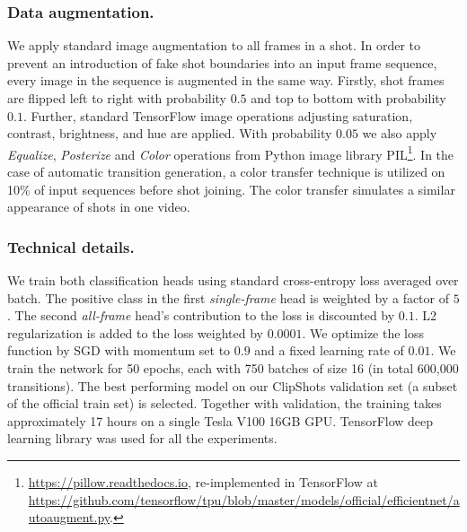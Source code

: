 \documentclass[sigconf]{acmart}
\begin{document}
\subsubsection{Data augmentation.}
We apply standard image augmentation to all frames in a shot. In order to prevent an introduction of fake shot boundaries into an input frame sequence, every image in the sequence is augmented in the same way. Firstly, shot frames are flipped left to right with probability $0.5$ and top to bottom with probability $0.1$. Further, standard TensorFlow image operations adjusting saturation, contrast, brightness, and hue are applied. With probability $0.05$ we also apply \textit{Equalize}, \textit{Posterize} and \textit{Color} operations from Python image library PIL\footnote{\url{https://pillow.readthedocs.io}, re-implemented in TensorFlow at \url{https://github.com/tensorflow/tpu/blob/master/models/official/efficientnet/autoaugment.py}.}. In the case of automatic transition generation, a color transfer technique is utilized on 10\% of input sequences before shot joining. The color transfer simulates a similar appearance of shots in one video.

\subsubsection{Technical details.}
We train both classification heads using standard cross-entropy loss averaged over batch. The positive class in the first \textit{single-frame} head is weighted by a factor of $5$. The second \textit{all-frame} head's contribution to the loss is discounted by $0.1$. L2 regularization is added to the loss weighted by $0.0001$. We optimize the loss function by SGD with momentum set to $0.9$ and a fixed learning rate of $0.01$. We train the network for 50 epochs, each with 750 batches of size 16 (in total 600,000 transitions). The best performing model on our ClipShots validation set (a subset of the official train set) is selected. Together with validation, the training takes approximately 17 hours on a single Tesla V100 16GB GPU. TensorFlow deep learning library was used for all the experiments.
\end{document}
